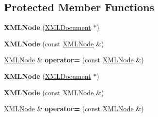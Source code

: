 \subsection*{Protected Member Functions}
\begin{DoxyCompactItemize}
\item 
\mbox{\label{classtinyxml2_1_1XMLNode_a29868df6ca383d574f584dfdd15105b6}} 
{\bfseries X\+M\+L\+Node} (\hyperlink{classtinyxml2_1_1XMLDocument}{X\+M\+L\+Document} $\ast$)
\item 
\mbox{\label{classtinyxml2_1_1XMLNode_a78be01384518a969da905548f318d75b}} 
{\bfseries X\+M\+L\+Node} (const \hyperlink{classtinyxml2_1_1XMLNode}{X\+M\+L\+Node} \&)
\item 
\mbox{\label{classtinyxml2_1_1XMLNode_ade79231d908e1f21862819e00e56ab6e}} 
\hyperlink{classtinyxml2_1_1XMLNode}{X\+M\+L\+Node} \& {\bfseries operator=} (const \hyperlink{classtinyxml2_1_1XMLNode}{X\+M\+L\+Node} \&)
\item 
\mbox{\label{classtinyxml2_1_1XMLNode_a29868df6ca383d574f584dfdd15105b6}} 
{\bfseries X\+M\+L\+Node} (\hyperlink{classtinyxml2_1_1XMLDocument}{X\+M\+L\+Document} $\ast$)
\item 
\mbox{\label{classtinyxml2_1_1XMLNode_a78be01384518a969da905548f318d75b}} 
{\bfseries X\+M\+L\+Node} (const \hyperlink{classtinyxml2_1_1XMLNode}{X\+M\+L\+Node} \&)
\item 
\mbox{\label{classtinyxml2_1_1XMLNode_ade79231d908e1f21862819e00e56ab6e}} 
\hyperlink{classtinyxml2_1_1XMLNode}{X\+M\+L\+Node} \& {\bfseries operator=} (const \hyperlink{classtinyxml2_1_1XMLNode}{X\+M\+L\+Node} \&)
\end{DoxyCompactItemize}
